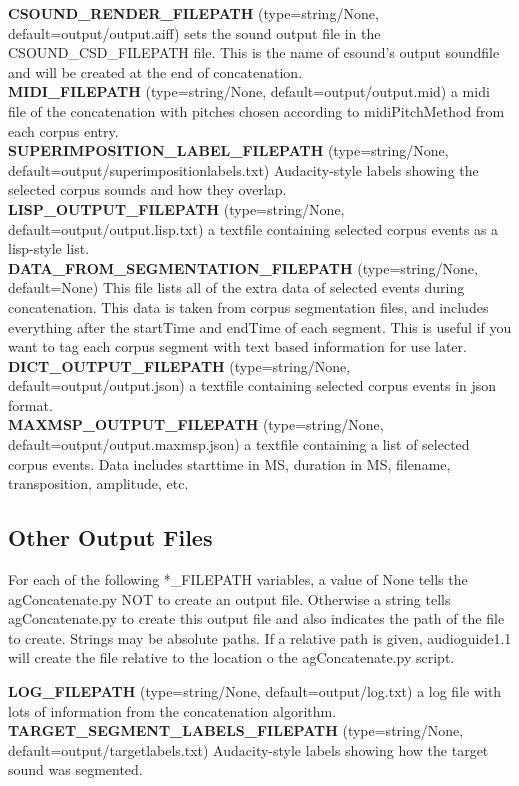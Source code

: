 \documentclass{article}
\newcommand{\optEntry}[4]{\textbf{#1} (type=#2, default=#3) #4\hspace{0.5em}\\}
\newcommand{\ag}{audioguide1.1 }
\begin{document}
\begin{spacing}{1.2}
\optEntry{CSOUND\_RENDER\_FILEPATH}{string/None}{output/output.aiff}{sets the sound output file in the CSOUND\_CSD\_FILEPATH file.  This is the name of csound's output soundfile and will be created at the end of concatenation.}

\optEntry{MIDI\_FILEPATH}{string/None}{output/output.mid}{a midi file of the concatenation with pitches chosen according to midiPitchMethod from each corpus entry.}

\optEntry{SUPERIMPOSITION\_LABEL\_FILEPATH}{string/None}{output/superimpositionlabels.txt}{Audacity-style labels showing the selected corpus sounds and how they overlap.}

\optEntry{LISP\_OUTPUT\_FILEPATH}{string/None}{output/output.lisp.txt}{a textfile containing selected corpus events as a lisp-style list.}

\optEntry{DATA\_FROM\_SEGMENTATION\_FILEPATH}{string/None}{None}{This file lists all of the extra data of selected events during concatenation.  This data is taken from corpus segmentation files, and includes everything after the startTime and endTime of each segment.  This is useful if you want to tag each corpus segment with text based information for use later.}

\optEntry{DICT\_OUTPUT\_FILEPATH}{string/None}{output/output.json}{a textfile containing selected corpus events in json format.}

\optEntry{MAXMSP\_OUTPUT\_FILEPATH}{string/None}{output/output.maxmsp.json}{a textfile containing a list of selected corpus events.  Data includes starttime in MS, duration in MS, filename, transposition, amplitude, etc.}


\subsection{Other Output Files}\label{otheroutputfiles}
For each of the following *\_FILEPATH variables, a value of None tells the agConcatenate.py NOT to create an output file.  Otherwise a string tells agConcatenate.py to create this output file and also indicates the path of the file to create.  Strings may be absolute paths.  If a relative path is given, \ag will create the file relative to the location o the agConcatenate.py script.

\optEntry{LOG\_FILEPATH}{string/None}{output/log.txt}{a log file with lots of information from the concatenation algorithm.}

\optEntry{TARGET\_SEGMENT\_LABELS\_FILEPATH}{string/None}{output/targetlabels.txt}{Audacity-style labels showing how the target sound was segmented.}


\end{spacing}
\end{document}
